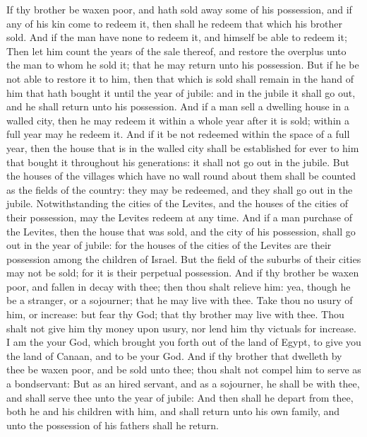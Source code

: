 \begin{biblechapter}
\verse If thy brother be waxen poor, and hath sold away some of his possession, and if any of his kin come to redeem it, then shall he redeem that which his brother sold.
\verse And if the man have none to redeem it, and himself be able to redeem it;
\verse Then let him count the years of the sale thereof, and restore the overplus unto the man to whom he sold it; that he may return unto his possession.
\verse But if he be not able to restore it to him, then that which is sold shall remain in the hand of him that hath bought it until the year of jubile: and in the jubile it shall go out, and he shall return unto his possession.
\verse And if a man sell a dwelling house in a walled city, then he may redeem it within a whole year after it is sold; within a full year may he redeem it.
\verse And if it be not redeemed within the space of a full year, then the house that is in the walled city shall be established for ever to him that bought it throughout his generations: it shall not go out in the jubile.
\verse But the houses of the villages which have no wall round about them shall be counted as the fields of the country: they may be redeemed, and they shall go out in the jubile.
\verse Notwithstanding the cities of the Levites, and the houses of the cities of their possession, may the Levites redeem at any time.
\verse And if a man purchase of the Levites, then the house that was sold, and the city of his possession, shall go out in the year of jubile: for the houses of the cities of the Levites are their possession among the children of Israel.
\verse But the field of the suburbs of their cities may not be sold; for it is their perpetual possession.
\verse And if thy brother be waxen poor, and fallen in decay with thee; then thou shalt relieve him: yea, though he be a stranger, or a sojourner; that he may live with thee.
\verse Take thou no usury of him, or increase: but fear thy God; that thy brother may live with thee.
\verse Thou shalt not give him thy money upon usury, nor lend him thy victuals for increase.
\verse I am the \LORD your God, which brought you forth out of the land of Egypt, to give you the land of Canaan, and to be your God.
\verse And if thy brother that dwelleth by thee be waxen poor, and be sold unto thee; thou shalt not compel him to serve as a bondservant:
\verse But as an hired servant, and as a sojourner, he shall be with thee, and shall serve thee unto the year of jubile:
\verse And then shall he depart from thee, both he and his children with him, and shall return unto his own family, and unto the possession of his fathers shall he return.

\end{biblechapter}
